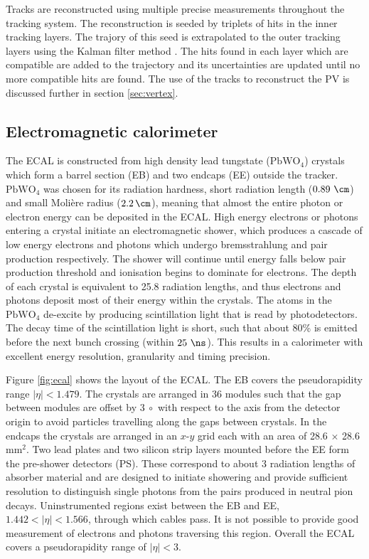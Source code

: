 Tracks are reconstructed using multiple precise measurements throughout the
tracking system. The reconstruction is seeded by triplets of hits in the inner
tracking layers. The trajory of this seed is extrapolated to the outer tracking
layers using the Kalman filter method \cite{Fruhwirth:1987fm}. The hits found in each layer
which are compatible are added to the trajectory and its uncertainties are
updated until no more compatible hits are found. The use of the tracks to
reconstruct the \ac{PV} is discussed further in section \ref{sec:vertex}.

\subsection{Electromagnetic calorimeter}
\label{sec:ecal}

The \ac{ECAL} is constructed from high density lead tungstate
($\mathrm{PbWO_{4}}$) crystals which form a barrel section (EB) 
and two endcaps (EE) outside the tracker. $\mathrm{PbWO_{4}}$ was chosen for its
radiation hardness, short radiation length ($0.89~\cm$) and small Moli\`ere
radius ($2.2\,\cm$), meaning that almost the entire photon or electron energy
can be deposited in the \ac{ECAL}. High energy electrons or photons
entering a crystal initiate an electromagnetic shower, which produces a cascade
of low energy electrons and photons which undergo bremsstrahlung and pair
production respectively. The shower will continue until energy falls below pair
production threshold and ionisation begins to dominate for electrons. 
The depth of each crystal is equivalent to 25.8 radiation lengths, and
thus electrons and photons deposit most of their energy within the crystals.
The atoms in the $\mathrm{PbWO_{4}}$ de-excite by producing scintillation light that is read by
photodetectors. The decay time of the scintillation light is short, such that
about 80\% is emitted before the next bunch crossing (within $25~\ns$). This
results in a calorimeter with excellent energy resolution, granularity and timing
precision.

Figure \ref{fig:ecal} shows the layout of the \ac{ECAL}. The EB covers the
pseudorapidity range $|\eta|<1.479$. The crystals are arranged in 36 modules such
that the gap between modules are offset by $3~\circ$ with respect to the axis
from the detector origin to avoid particles travelling along the gaps between
crystals. In
the endcaps the crystals are arranged in an $x$-$y$ grid each with an area of
28.6$\,\times\,$28.6 $\mathrm{mm^{2}}$. Two lead plates and two silicon strip
layers mounted before the EE form the pre-shower detectors (PS). These correspond to about
$3$ radiation lengths of absorber material and are designed to initiate
showering and provide sufficient resolution to distinguish single photons from
the pairs produced in neutral pion decays. Uninstrumented regions exist
between the EB and EE, $1.442 < |\eta| < 1.566$, through which cables pass. It
is not possible to provide good measurement of electrons and photons traversing
this region. Overall the \ac{ECAL} covers a pseudorapidity range of $|\eta|<3$.


